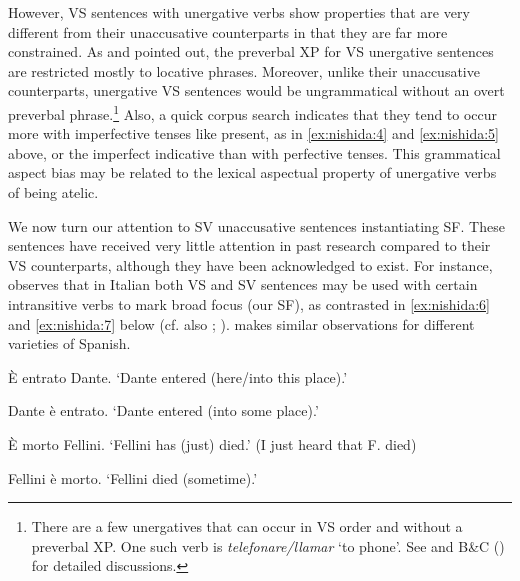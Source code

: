 \documentclass[output=paper,colorlinks,citecolor=brown,
]{langscibook}
\begin{document}
However, VS sentences with unergative verbs show properties that are very different from their unaccusative counterparts in that they are far more constrained. As \citet{torrego1989} and \citet{pinto1997} pointed out, the preverbal XP for VS unergative sentences are restricted mostly to locative phrases. Moreover, unlike their unaccusative counterparts, unergative VS sentences would be ungrammatical without an overt preverbal phrase.\footnote{There are a few unergatives that can occur in VS order and without a preverbal XP. One such verb is \textit{telefonare/llamar} `to phone'. See \citet{corr2016wide} and B\&C (\citeyear{bentley2018silent}) for detailed discussions.} Also, a quick corpus search indicates that they tend to occur more with imperfective tenses like present, as in \ref{ex:nishida:4} and \ref{ex:nishida:5} above, or the imperfect indicative than with perfective tenses. This grammatical aspect bias may be related to the lexical aspectual property of unergative verbs of being atelic.

We now turn our attention to SV unaccusative sentences instantiating SF. These sentences have received very little attention in past research compared to their VS counterparts, although they have been acknowledged to exist. For instance, \citet{pinto1997} observes that in Italian both VS and SV sentences may be used with certain intransitive verbs to mark broad focus (our SF), as contrasted in \ref{ex:nishida:6} and \ref{ex:nishida:7} below (cf. also \citealt{antinucci1977sull}; \citealt{sornicola1994}). \citet{corr2016wide}
makes similar observations for different varieties of Spanish.



\begin{exe} %
    \ex\label{ex:nishida:6} 
    \begin{xlist} 
        \ex\label{ex:nishida:6a} È entrato Dante.
        \glt ‘Dante entered (here/into this place).’
          
        \ex\label{ex:nishida:6b} Dante è entrato.
        \glt ‘Dante entered (into some place).’ \citep[188, ex. 19a-b]{pinto1997} 
\end{xlist}
\end{exe}

\begin{exe} %
    \ex\label{ex:nishida:7} 
    \begin{xlist} 
        \ex\label{ex:nishida:7a} È morto Fellini.
        \glt ‘Fellini has (just) died.’ (I just heard that F. died)
          
        \ex\label{ex:nishida:7b} Fellini è morto.
        \glt ‘Fellini died (sometime).’ \citep[118,~exx.~20a--b]{pinto1997}
          
\end{xlist}
\end{exe}
\end{document}
